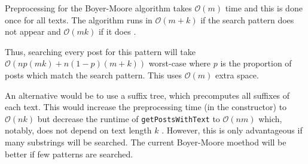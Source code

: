 \documentclass[11pt,a4paper]{article} %
\begin{document}
Preprocessing for the Boyer-Moore algorithm takes $\mathcal O(m)$ time
and this is done once for all texts.
The algorithm runs in $\mathcal O(m + k)$ if the 
search pattern does not appear and $\mathcal O(mk)$ if it does \cite{sustik}. 

Thus, searching every post for this pattern will take $\mathcal O(np(mk) + n(1-p)(m+k))$
worst-case where $p$ is the proportion of posts which match the search pattern.
This uses $\mathcal O(m)$ extra space.

An alternative would be to use a suffix tree, which precomputes all suffixes of 
each text. This would increase the preprocessing time (in the constructor) 
to $\mathcal O(nk)$ but decrease the runtime of \verb|getPostsWithText|
to $\mathcal O(nm)$ which, notably, does not depend on text length $k$ \cite{suffix}.
However, this is only advantageous if many substrings will be searched. The current 
Boyer-Moore moethod will be better if few patterns are searched.
 



\end{document}
